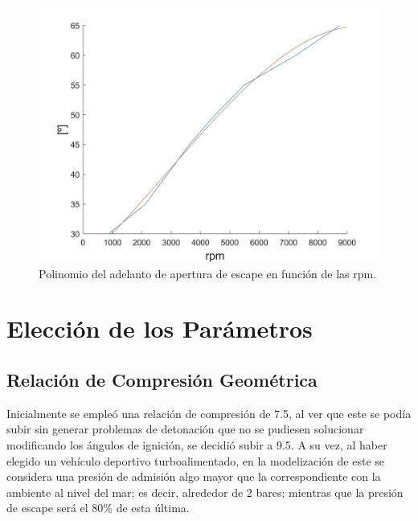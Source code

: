 \begin{table}[htbp]
    \centering
    \caption{Adelantos de apertura de escape que obtienen mayor potencia en función de las rpm.}
    \label{tab:rpm_AAE}
\end{table}

\begin{figure}[H]
    \centering
    \includegraphics[width=0.6\linewidth]{Figures/01/regresion_aae.jpg}
    \caption{Polinomio del adelanto de apertura de escape en función de las rpm.}
    \label{fig:RPM_aae_regresión}
\end{figure}



\section{Elección de los Parámetros} \label{s:section_05}
\subsection{Relación de Compresión Geométrica} \label{s:subsection_01}
Inicialmente se empleó una relación de compresión de 7.5, al ver que este se podía subir sin generar problemas de detonación que no se pudiesen solucionar modificando los ángulos de ignición, se decidió subir a 9.5. A su vez, al haber elegido un vehículo deportivo turboalimentado, en la modelización de este se considera una presión de admisión algo mayor que la correspondiente con la ambiente al nivel del mar; es decir, alrededor de 2 bares; mientras que la presión de escape será el 80\% de esta última.

